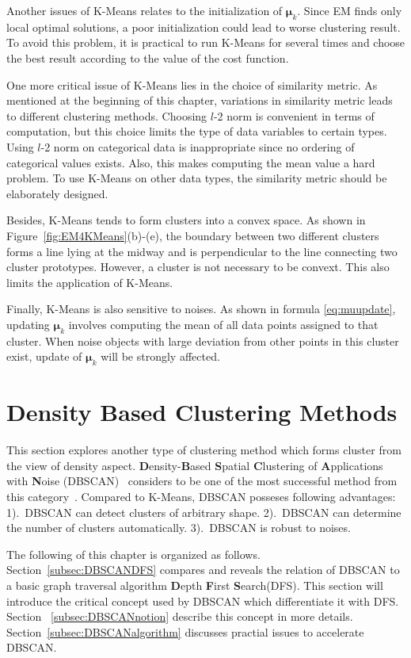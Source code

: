 Another issues of K-Means relates to the initialization of \(\boldsymbol{\mu}_k\). Since EM finds only local optimal solutions, a poor initialization could lead to worse clustering result. To avoid this problem, it is practical to run K-Means for several times and choose the best result according to the value of the cost function.

One more critical issue of K-Means lies in the choice of similarity metric. As mentioned at the beginning of this chapter, variations in similarity metric leads to different clustering methods. Choosing \(l\)-2 norm is convenient in terms of computation, but this choice limits the type of data variables to certain types. Using \(l\)-2 norm on categorical data is inappropriate since no ordering of categorical values exists. Also, this makes computing the mean value a hard problem. To use K-Means on other data types, the similarity metric should be elaborately designed. 

Besides, K-Means tends to form clusters into a convex space. As shown in Figure~\ref{fig:EM4KMeans}(b)-(e), the boundary between two different clusters forms a line lying at the midway and is perpendicular to the line connecting two cluster prototypes. However, a cluster is not necessary to be convext. This also limits the application of K-Means.

Finally, K-Means is also sensitive to noises. As shown in formula \ref{eq:muupdate}, updating \(\boldsymbol{\mu}_k\) involves computing the mean of all data points assigned to that cluster. When noise objects with large deviation from other points in this cluster exist, update of \(\boldsymbol{\mu}_k\) will be strongly affected. 

\section{Density Based Clustering Methods}
This section explores another type of clustering method which forms cluster from the view of density aspect. \textbf{D}ensity-\textbf{B}ased \textbf{S}patial \textbf{C}lustering of \textbf{A}pplications with \textbf{N}oise (DBSCAN)~\cite{ester1996density} considers to be one of the most successful method from this category~\cite{2014timeaward}. Compared to K-Means, DBSCAN posseses following advantages: 1).\ DBSCAN can detect clusters of arbitrary shape. 2).\ DBSCAN can determine the number of clusters automatically. 3).\ DBSCAN is robust to noises. 

The following of this chapter is organized as follows. Section~\ref{subsec:DBSCANDFS} compares and reveals the relation of DBSCAN to a basic graph traversal algorithm \textbf{D}epth \textbf{F}irst \textbf{S}earch(DFS). This section will introduce the critical concept used by DBSCAN which differentiate it with DFS. Section ~\ref{subsec:DBSCANnotion} describe this concept in more details. Section~\ref{subsec:DBSCANalgorithm} discusses practial issues to accelerate DBSCAN.

